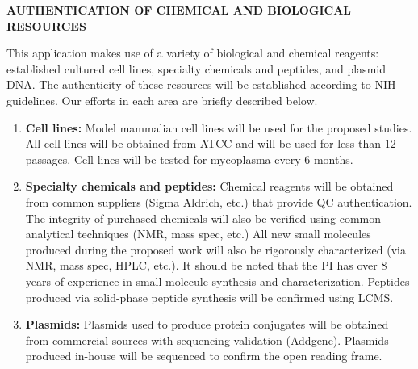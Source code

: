 \begin{center}
{\bf AUTHENTICATION OF CHEMICAL AND BIOLOGICAL RESOURCES}
\end{center}

This application makes use of a variety of biological and chemical reagents: established cultured cell lines, specialty chemicals and peptides, and plasmid DNA. The authenticity of these resources will be established according to NIH guidelines. Our efforts in each area are briefly described below.

\begin{enumerate}
  \item {\bf Cell lines:} Model mammalian cell lines will be used for the proposed studies. All cell lines will be obtained from ATCC and will be used for less than 12 passages. Cell lines will be tested for mycoplasma every 6 months.
  \item {\bf Specialty chemicals and peptides:} Chemical reagents will be obtained from common suppliers (Sigma Aldrich, etc.) that provide QC authentication.  The integrity of purchased chemicals will also be verified using common analytical techniques (NMR, mass spec, etc.)  All new small molecules produced during the proposed work will also be rigorously characterized (via NMR, mass spec, HPLC, etc.).  It should be noted that the PI has over 8 years of experience in small molecule synthesis and characterization.
  Peptides produced via solid-phase peptide synthesis will be confirmed using LCMS.
  \item {\bf Plasmids:} Plasmids used to produce protein conjugates will be obtained from commercial sources with sequencing validation (Addgene). Plasmids produced in-house will be sequenced to confirm the open reading frame.
\end{enumerate}


